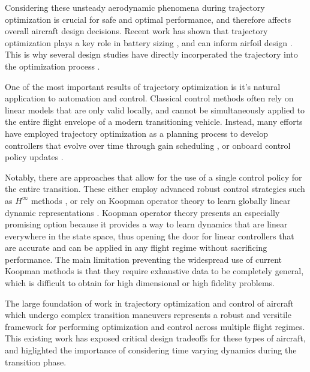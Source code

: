 \documentclass[12pt, letterpaper]{article}
\begin{document}
Considering these unsteady aerodynamic phenomena during trajectory optimization is crucial for safe and optimal performance, and therefore affects overall aircraft design decisions.  Recent work has shown that trajectory optimization plays a key role in battery sizing \cite{liu2024flight}, and can inform airfoil design \cite{panish2025tiltwing}.  This is why several design studies have directly incorperated the trajectory into the optimization process \cite{sarojini2023large, kaneko2024simultaneous, kaneko2025simultaneous}. 

One of the most important results of trajectory optimization is it's natural application to automation and control.  Classical control methods often rely on linear models that are only valid locally, and cannot be simultaneously applied to the entire flight envelope of a modern transitioning vehicle.  Instead, many efforts have employed trajectory optimization as a planning process to develop controllers that evolve over time through gain scheduling \cite{thompson2020robust}, or onboard control policy updates \cite{gupta2025realtimeplanningcontrolvortex}.

Notably, there are approaches that allow for the use of a single control policy for the entire transition.  These either employ advanced robust control strategies such as $H^{\infty}$ methods \cite{yang2021robust}, or rely on Koopman operator theory to learn globally linear dynamic representations \cite{korda2018koopman, abraham2017modelbased, zinage2021koopman}.  Koopman operator theory presents an especially promising option because it provides a way to learn dynamics that are linear everywhere in the state space, thus opening the door for linear controllers that are accurate and can be applied in any flight regime without sacrificing performance.  The main limitation preventing the widespread use of current Koopman methods is that they require exhaustive data to be completely general, which is difficult to obtain for high dimensional or high fidelity problems. 

The large foundation of work in trajectory optimization and control of aircraft which undergo complex transition maneuvers represents a robust and versitile framework for performing optimization and control across multiple flight regimes.  This existing work has exposed critical design tradeoffs for these types of aircraft, and higlighted the importance of considering time varying dynamics during the transition phase.  
\end{document}
